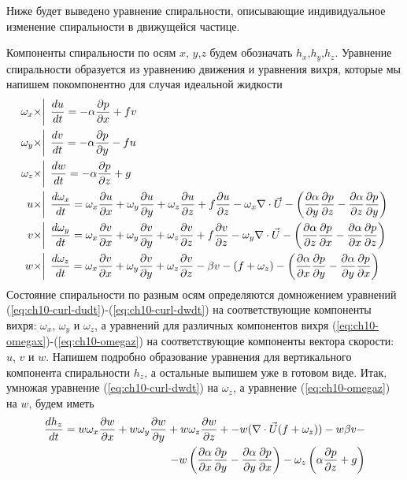 Ниже будет выведено уравнение спиральности, описывающие индивидуальное изменение спиральности в движущейся частице. 

Компоненты спиральности по осям $x$, $y$,$z$ будем обозначать $h_x$,$h_y$,$h_z$. Уравнение спиральности образуется из уравнению движения и уравнения вихря, которые мы напишем покомпонентно для случая идеальной жидкости
\begin{align}
    \omega_x \times &\bigg| \:\: \td{u}{t} = -\alpha\pd{p}{x}+fv \label{eq:ch10-curl-dudt} \\  
    \omega_y \times &\bigg| \:\: \td{v}{t} = -\alpha\pd{p}{y}-fu \label{eq:ch10-curl-dvdt} \\ 
    \omega_z \times &\bigg| \:\: \td{w}{t} = -\alpha\pd{p}{z}+g  \label{eq:ch10-curl-dwdt} \\ 
    u \times &\bigg| \:\: \td{\omega_x}{t} = 
            \omega_x\pd{u}{x} + \omega_y\pd{u}{y} + \omega_z\pd{u}{z} + f\pd{u}{z} - 
            \omega_x \nabla\cdot\vec{U} -\rb{ \pd{\alpha}{y}\pd{p}{z} - 
            \pd{\alpha}{z}\pd{p}{y} } \label{eq:ch10-omegax} \\ 
    v \times &\bigg| \:\: \td{\omega_y}{t} = 
            \omega_x\pd{v}{x} + \omega_y\pd{v}{y} + \omega_z\pd{v}{z} + f\pd{v}{z} - 
            \omega_y \nabla\cdot\vec{U} -\rb{ \pd{\alpha}{z}\pd{p}{x} - 
            \pd{\alpha}{x}\pd{p}{z} } \label{eq:ch10-omegay} \\ 
    w \times &\bigg| \:\: \td{\omega_z}{t} = 
            \omega_x\pd{v}{x} + \omega_y\pd{v}{y} + \omega_z\pd{v}{z} - \beta v  - 
            (f+\omega_z) - \rb{ \pd{\alpha}{x}\pd{p}{y} - 
            \pd{\alpha}{y}\pd{p}{x} } \label{eq:ch10-omegaz} 
\end{align}
Состояние спиральности по разным осям определяются домножением уравнений (\ref{eq:ch10-curl-dudt})-(\ref{eq:ch10-curl-dwdt}) на соответствующие компоненты вихря: $\omega_x$, $\omega_y$ и $\omega_z$, а уравнений для различных компонентов вихря (\ref{eq:ch10-omegax})-(\ref{eq:ch10-omegaz}) на соответствующие компоненты вектора скорости: $u$, $v$ и $w$. Напишем подробно образование уравнения для вертикального компонента спиральности $h_z$, а остальные выпишем уже в готовом виде. Итак, умножая уравнение (\ref{eq:ch10-curl-dwdt}) на $\omega_z$, а уравнение (\ref{eq:ch10-omegaz}) на $w$, будем иметь
\begin{align*}
    \td{h_z}{t} = w\omega_x\pd{w}{x} + w\omega_y\pd{w}{y} + w\omega_z\pd{w}{z} + 
      - w(\nabla\cdot\vec{U}(f+\omega_z)) - w\beta v - \\
      - w \rb{ \pd{\alpha}{x}\pd{p}{y} - \pd{\alpha}{y}\pd{p}{x} } - \omega_z \rb{ \alpha\pd{p}{z}+g }
\end{align*}
